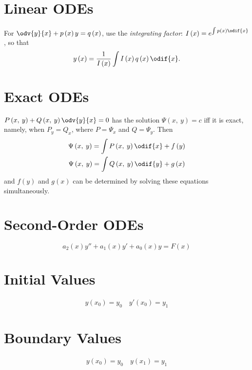 \documentclass{article}
\begin{document}
\begin{multicols}{3}
    \section*{Linear ODEs}
    For \(\odv{y}{x} + p\left( x \right)y = q\left( x \right)\), use the \textit{integrating factor}:
    \(I\left( x \right) = e^{\int p\left( x \right) \odif{x}}\), so that
    \begin{equation*}
        y\left( x \right) = \frac{1}{I\left( x \right)} \int I\left( x \right) q\left( x \right) \odif{x}.
    \end{equation*}
    \section*{Exact ODEs}
    \(P\left( x,\: y \right) + Q\left( x,\: y \right)\odv{y}{x} = 0\)
    has the solution
    \(\Psi\left( x,\: y \right) = c\)
    iff it is exact, namely, when
    \(P_y = Q_x\),
    where \(P = \Psi_x\) and \(Q = \Psi_y\). Then
    \begin{gather*}
        \Psi\left( x,\: y \right) = \int P\left( x,\: y \right) \odif{x} + f\left( y \right) \\
        \Psi\left( x,\: y \right) = \int Q\left( x,\: y \right) \odif{y} + g\left( x \right)
    \end{gather*}
    and \(f\left( y \right)\) and \(g\left( x \right)\) can be determined by solving these equations simultaneously.
    \section*{Second-Order ODEs}
    \begin{equation*}
        a_2\left( x \right)y'' + a_1\left( x \right)y' + a_0\left( x \right)y = F\left( x \right)
    \end{equation*}
    \section*{Initial Values}
    \begin{align*}
        y\left( x_0 \right) = y_0 \quad y'\left( x_0 \right) = y_1
    \end{align*}
    \section*{Boundary Values}
    \begin{align*}
        y\left( x_0 \right) = y_0 \quad y\left( x_1 \right) = y_1
    \end{align*}

\end{multicols}
\end{document}
